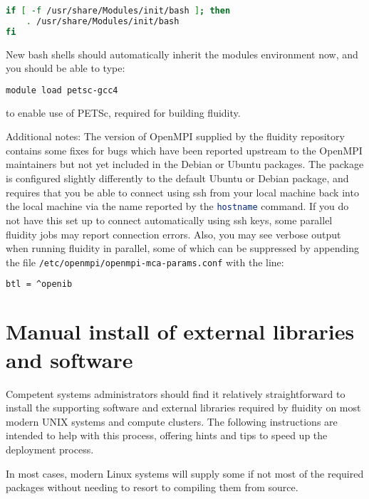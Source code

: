 \begin{lstlisting}[language=bash]
if [ -f /usr/share/Modules/init/bash ]; then
    . /usr/share/Modules/init/bash
fi
\end{lstlisting}

New bash shells should automatically inherit the modules environment now, and
you should be able to type:

\begin{lstlisting}[language=bash]
module load petsc-gcc4
\end{lstlisting}

to enable use of PETSc, required for building fluidity.
 
Additional notes: The version of OpenMPI supplied by the fluidity repository
contains some fixes for bugs which have been reported upstream to the OpenMPI
maintainers but not yet included in the Debian or Ubuntu packages. The package
is configured slightly differently to the default Ubuntu or Debian package, and
requires that you be able to connect using ssh from your local machine back
into the local machine via the name reported by the
\lstinline[language=bash]+hostname+ command. If you do not have this set up to
connect automatically using ssh keys, some parallel fluidity jobs may report
connection errors. Also, you may see verbose output when running fluidity in
parallel, some of which can be suppressed by appending the file
\lstinline[language=bash]+/etc/openmpi/openmpi-mca-params.conf+ with the line:

\begin{lstlisting}[language=bash]
btl = ^openib
\end{lstlisting}

\section{Manual install of external libraries and software}
\label{sect:required_ḻibraries_manual_install}

Competent systems administrators should find it relatively straightforward to
install the supporting software and external libraries required by fluidity on
most modern UNIX systems and compute clusters. The following instructions are
intended to help with this process, offering hints and tips to speed up the
deployment process.

In most cases, modern Linux systems will supply some if not most of the
required packages without needing to resort to compiling them from source.

